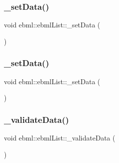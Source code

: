 \subsubsection{\texorpdfstring{\+\_\+set\+Data()}{\_setData()}\hspace{0.1cm}{\footnotesize\ttfamily [1/2]}}
{\footnotesize\ttfamily void ebml\+::ebml\+List\+::\+\_\+set\+Data (\begin{DoxyParamCaption}\item[{const \mbox{\hyperlink{namespaceebml_a1ddadd26791f273d851882653b9caf70}{ebml\+Element\+\_\+l}} \&}]{ }\end{DoxyParamCaption})\hspace{0.3cm}{\ttfamily [protected]}}

\mbox{\label{classebml_1_1ebmlList_af612aabfde64c4ef1c93ad7c16e76aa5}} 
\subsubsection{\texorpdfstring{\+\_\+set\+Data()}{\_setData()}\hspace{0.1cm}{\footnotesize\ttfamily [2/2]}}
{\footnotesize\ttfamily void ebml\+::ebml\+List\+::\+\_\+set\+Data (\begin{DoxyParamCaption}\item[{\mbox{\hyperlink{namespaceebml_a1ddadd26791f273d851882653b9caf70}{ebml\+Element\+\_\+l}} \&\&}]{ }\end{DoxyParamCaption})\hspace{0.3cm}{\ttfamily [protected]}}

\mbox{\label{classebml_1_1ebmlList_a438c83de7e7fe38aced71d9ad27d29b9}} 
\subsubsection{\texorpdfstring{\+\_\+validate\+Data()}{\_validateData()}}
{\footnotesize\ttfamily void ebml\+::ebml\+List\+::\+\_\+validate\+Data (\begin{DoxyParamCaption}\item[{const \mbox{\hyperlink{namespaceebml_a1ddadd26791f273d851882653b9caf70}{ebml\+Element\+\_\+l}} \&}]{ }\end{DoxyParamCaption})\hspace{0.3cm}{\ttfamily [protected]}}


